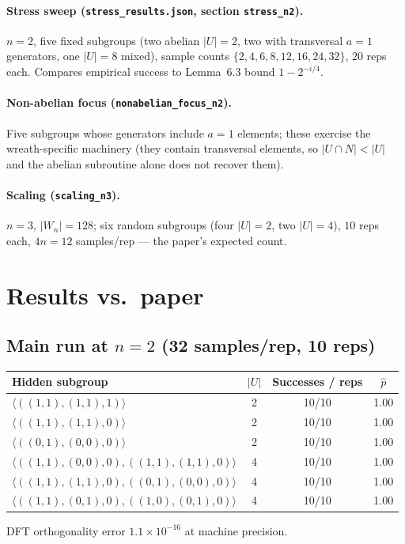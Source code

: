 \documentclass[11pt]{article}
\begin{document}
\paragraph{Stress sweep (\texttt{stress\_results.json}, section
\texttt{stress\_n2}).} $n=2$, five fixed subgroups (two abelian
$|U|=2$, two with transversal $a{=}1$ generators, one $|U|=8$ mixed),
sample counts $\{2,4,6,8,12,16,24,32\}$, $20$ reps each. Compares
empirical success to Lemma~6.3 bound $1 - 2^{-i/4}$.

\paragraph{Non-abelian focus (\texttt{nonabelian\_focus\_n2}).} Five
subgroups whose generators include $a{=}1$ elements; these exercise the
wreath-specific machinery (they contain transversal elements, so
$|U \cap N| < |U|$ and the abelian subroutine alone does not recover them).

\paragraph{Scaling (\texttt{scaling\_n3}).} $n=3$, $|W_n| = 128$; six
random subgroups (four $|U|=2$, two $|U|=4$), $10$ reps each, $4n = 12$
samples/rep --- the paper's expected count.

\section{Results vs.\ paper}

\subsection{Main run at $n=2$ (32 samples/rep, 10 reps)}
\begin{center}
\begin{tabular}{lccc}
\toprule
Hidden subgroup & $|U|$ & Successes / reps & $\hat p$ \\
\midrule
$\langle ((1,1),(1,1),1)\rangle$ & 2 & 10/10 & 1.00 \\
$\langle ((1,1),(1,1),0)\rangle$ & 2 & 10/10 & 1.00 \\
$\langle ((0,1),(0,0),0)\rangle$ & 2 & 10/10 & 1.00 \\
$\langle ((1,1),(0,0),0),((1,1),(1,1),0)\rangle$ & 4 & 10/10 & 1.00 \\
$\langle ((1,1),(1,1),0),((0,1),(0,0),0)\rangle$ & 4 & 10/10 & 1.00 \\
$\langle ((1,1),(0,1),0),((1,0),(0,1),0)\rangle$ & 4 & 10/10 & 1.00 \\
\bottomrule
\end{tabular}
\end{center}
DFT orthogonality error $1.1\times 10^{-16}$ at machine precision.
\end{document}

